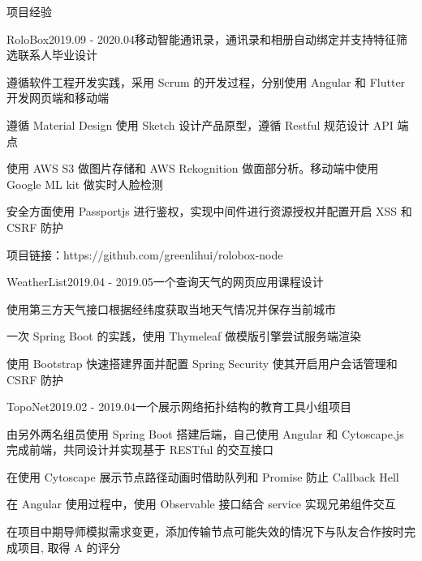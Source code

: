 \documentclass{resume} %
\begin{document}
\begin{rSection}{项目经验}

\begin{rSubsection}{RoloBox}{2019.09 - 2020.04}{移动智能通讯录，通讯录和相册自动绑定并支持特征筛选联系人}{毕业设计}
\item 遵循软件工程开发实践，采用 Scrum 的开发过程，分别使用 Angular 和 Flutter 开发网页端和移动端
\item 遵循 Material Design 使用 Sketch 设计产品原型，遵循 Restful 规范设计 API 端点
\item 使用 AWS S3 做图片存储和 AWS Rekognition 做面部分析。移动端中使用 Google ML kit 做实时人脸检测
\item 安全方面使用 Passportjs 进行鉴权，实现中间件进行资源授权并配置开启 XSS 和 CSRF 防护
\item 项目链接：https://github.com/greenlihui/rolobox-node
\end{rSubsection}

\begin{rSubsection}{WeatherList}{2019.04 - 2019.05}{一个查询天气的网页应用}{课程设计}
\item 使用第三方天气接口根据经纬度获取当地天气情况并保存当前城市
\item 一次 Spring Boot 的实践，使用 Thymeleaf 做模版引擎尝试服务端渲染
\item 使用 Bootstrap 快速搭建界面并配置 Spring Security 使其开启用户会话管理和 CSRF 防护
\end{rSubsection}

\begin{rSubsection}{TopoNet}{2019.02 - 2019.04}{一个展示网络拓扑结构的教育工具}{小组项目}
\item 由另外两名组员使用 Spring Boot 搭建后端，自己使用 Angular 和 Cytoscape.js 完成前端，共同设计并实现基于 RESTful 的交互接口
\item 在使用 Cytoscape 展示节点路径动画时借助队列和 Promise 防止 Callback Hell
\item 在 Angular 使用过程中，使用 Observable 接口结合 service 实现兄弟组件交互
\item 在项目中期导师模拟需求变更，添加传输节点可能失效的情况下与队友合作按时完成项目, 取得 A 的评分
\end{rSubsection}

\end{rSection}


\end{document}
